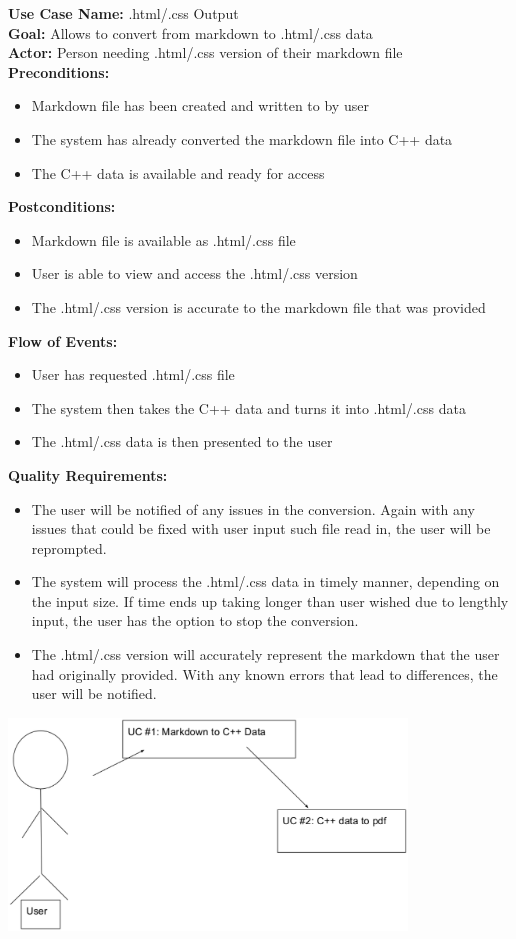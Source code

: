 \textbf{Use Case Name:} .html/.css Output  
\\
\textbf{Goal:} Allows to convert from markdown to .html/.css data
\\
\textbf{Actor:} Person needing .html/.css version of their markdown file
\\
\textbf{Preconditions:} 
\begin{itemize}
\item Markdown file has been created and written to by user 
\item The system has already converted the markdown file into C++ data
\item The C++ data is available and ready for access 
\end{itemize}
\textbf{Postconditions:} 
\begin{itemize}
\item Markdown file is available as .html/.css file 
\item User is able to view and access the .html/.css version
\item The .html/.css version is accurate to the markdown file that was provided 
\end{itemize}
\textbf{Flow of Events:} 
\begin{itemize} 
\item User has requested .html/.css file
\item The system then takes the C++ data and turns it into .html/.css data 
\item The .html/.css data is then presented to the user 
\end{itemize}
\textbf{Quality Requirements:} 
\begin{itemize}
\item The user will be notified of any issues in the conversion. Again with any issues that could be fixed with user input such file read in, the user will be reprompted. 
\item The system will process the .html/.css data in timely manner, depending on the input size. If time ends up taking longer than user wished due to lengthly input, the user has the option to stop the conversion.  
\item The .html/.css version will accurately represent the markdown that the user had originally provided. With any known errors that lead to differences, the user will be notified. 
%
\end{itemize} 


\includegraphics[width=300pt]{images/useCase.eps}
